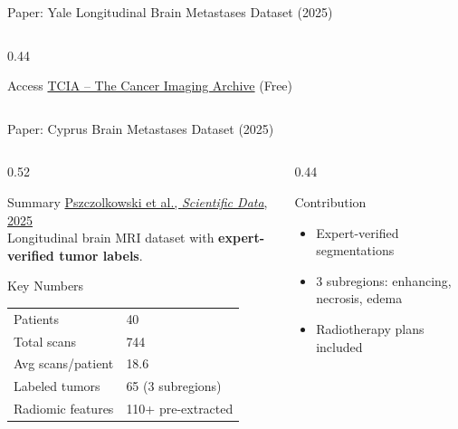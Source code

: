 \documentclass[aspectratio=169,xcolor=dvipsnames]{beamer}
\begin{document}
\begin{frame}{Paper: Yale Longitudinal Brain Metastases Dataset (2025)}
\begin{columns}
\begin{column}{0.44\textwidth}
            \begin{exampleblock}{\scriptsize {} Access}
                \scriptsize \href{https://www.cancerimagingarchive.net/}{TCIA -- The Cancer Imaging Archive} (Free)
            \end{exampleblock}
        \end{column}
    \end{columns}
\end{frame}

\begin{frame}{Paper: Cyprus Brain Metastases Dataset (2025)}
    \begin{columns}
        \begin{column}{0.52\textwidth}
            \begin{block}{Summary}
                \small
                \href{https://doi.org/10.1038/s41597-025-04608-2}{Pszczolkowski et al., \textit{Scientific Data}, 2025}\\[0.3em]
                Longitudinal brain MRI dataset with \textbf{expert-verified tumor labels}.
            \end{block}

            \vspace{0.2em}

            \begin{block}{Key Numbers}
                \small
                \begin{tabular}{ll}
                    Patients & 40 \\
                    Total scans & 744 \\
                    Avg scans/patient & 18.6 \\
                    Labeled tumors & 65 (3 subregions) \\
                    Radiomic features & 110+ pre-extracted \\
                \end{tabular}
            \end{block}
        \end{column}

        \begin{column}{0.44\textwidth}
            \begin{block}{Contribution}
                \small
                \begin{itemize}
                    \item Expert-verified segmentations
                    \item 3 subregions: enhancing, necrosis, edema
                    \item Radiotherapy plans included
                \end{itemize}
            \end{block}


\end{column}
\end{columns}
\end{frame}
\end{document}
